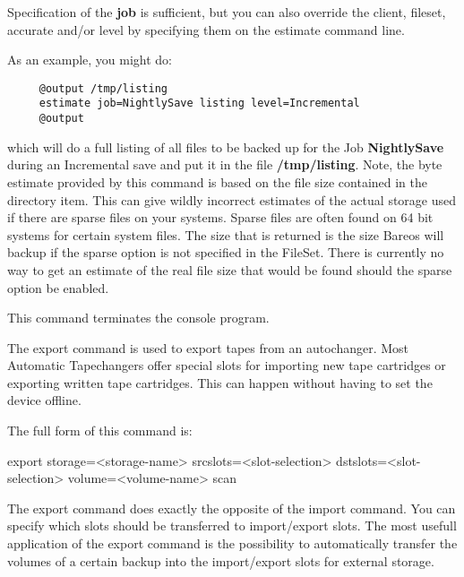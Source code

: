 \begin{description}
{   Specification of the {\bf job} is sufficient, but you can also override the
   client, fileset, accurate and/or level by specifying them on the estimate
   command line.

As an example, you might do:

\footnotesize
\begin{verbatim}
     @output /tmp/listing
     estimate job=NightlySave listing level=Incremental
     @output
\end{verbatim}
\normalsize

   which will do a full listing of all files to be backed up for the  Job {\bf
   NightlySave} during an Incremental save and put it in the  file {\bf
   /tmp/listing}.  Note, the byte estimate provided by this command is
   based on the file size contained in the directory item. This can give
   wildly incorrect estimates of the actual storage used if there are
   sparse files on your systems. Sparse files are often found on 64 bit
   systems for certain system files. The size that is returned is the size
   Bareos will backup if the sparse option is not specified in the FileSet.
   There is currently no way to get an estimate of the real file size that
   would be found should the sparse option be enabled.

\item [exit]
   This command terminates the console program.

\item [export]
   The export command is used to export tapes from an autochanger. Most Automatic
   Tapechangers offer special slots for importing new tape cartridges or
   exporting written tape cartridges. This can happen without having to set
   the device offline.

   The full form of this command is:

export storage={\textless}storage-name{\textgreater} srcslots={\textless}slot-selection{\textgreater}
  {\textlbrack} dstslots={\textless}slot-selection{\textgreater} volume={\textless}volume-name{\textgreater} scan {\textrbrack}

   The export command does exactly the opposite of the import command. You
   can specify which slots should be transferred to import/export slots. The
   most usefull application of the export command is the possibility to
   automatically transfer the volumes of a certain backup into the import/export
   slots for external storage.

}
\end{description}
